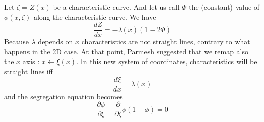 \documentclass[11pt]{article}
\newcommand{\p}[2]{\ensuremath{\frac{\partial {#1}}{\partial {#2}}}}
\newcommand{\tot}[2]{\ensuremath{\frac{d {#1}}{d {#2}}}}
\newcommand{\z}{\ensuremath{\zeta}}
\newcommand{\x}{\ensuremath{\xi}}
\newcommand{\lam}{\ensuremath{\lambda}}
\begin{document}
Let $\z = Z(x)$ be a characteristic curve. And let us call $\Phi$ the (constant) value of  $\phi(x,\z)$ along the characteristic curve. We have
\begin{equation}
	\tot{Z}{x} = - \lam(x) ( 1 - 2 \Phi)
\end{equation}
Because $\lam$ depends on $x$ characteristics are not straight lines, contrary to what happens in the 2D case. 
At that point, Parmesh suggested that we remap also the $x$ axis : $x \leftarrow \x(x)$. 
In this new system of coordinates, characteristics will be straight lines iff
\begin{equation}
	\tot{\x}{x} = \lam(x)
\end{equation}
and the segregation equation becomes
\begin{equation}
	\p{\phi}{\x} - \p{}{\z} \phi (1 - \phi) = 0
\end{equation}
\end{document}
